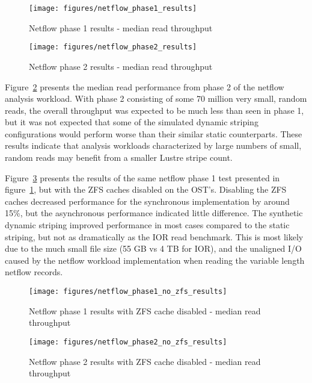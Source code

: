 \documentclass[conference,compsoc]{IEEEtran}
\begin{document}
\begin{figure}[t]
\centering
  \texttt{[image: figures/netflow\_phase1\_results]}
\caption{Netflow phase 1 results - median read throughput}
\label{fig:netflow_phase1_results}
\end{figure}

\begin{figure}[t]
\centering
  \texttt{[image: figures/netflow\_phase2\_results]}
\caption{Netflow phase 2 results - median read throughput}
\label{fig:netflow_phase2_results}
\end{figure}

Figure~\ref{fig:netflow_phase2_results} presents the median read performance from phase 2 of the netflow analysis workload.   With phase 2 consisting of some 70 million very small, random reads, the overall throughput was expected to be much less than seen in phase 1, but it was not expected that some of the simulated dynamic striping configurations would perform worse than their similar static counterparts.  These results indicate that analysis workloads characterized by large numbers of small, random reads may benefit from a smaller Lustre stripe count. 

Figure~\ref{fig:netflow_phase1_no_zfs_results} presents the results of the same netflow phase 1 test presented in figure~\ref{fig:netflow_phase1_results}, but with the ZFS caches disabled on the OST's. Disabling the ZFS caches decreased performance for the synchronous implementation by around 15\%, but the asynchronous performance indicated little difference. The synthetic dynamic striping improved performance in most cases compared to the static striping, but not as dramatically as the IOR read benchmark. This is most likely due to the much small file size (55 GB vs 4 TB for IOR), and the unaligned I/O caused by the netflow workload implementation when reading the variable length netflow records. 

\begin{figure}[t]
\centering
  \texttt{[image: figures/netflow\_phase1\_no\_zfs\_results]}
\caption{Netflow phase 1 results with ZFS cache disabled - median read throughput}
\label{fig:netflow_phase1_no_zfs_results}
\end{figure}

\begin{figure}[t]
\centering
  \texttt{[image: figures/netflow\_phase2\_no\_zfs\_results]}
\caption{Netflow phase 2 results with ZFS cache disabled - median read throughput}
\label{fig:netflow_phase2_no_zfs_results}
\end{figure}
\end{document}
